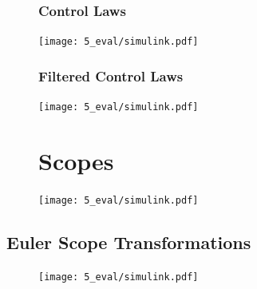 \documentclass[12pt]{ucthesis}
\begin{document}
	\begin{figure}
	\subsubsection{Control Laws}
	\label{subsubsec: app_FURY_eom5}
			\centering
			\texttt{[image: 5\_eval/simulink.pdf]}%
		\label{fig: cfbs_FURY_eom5}
	\end{figure}

	\begin{figure}
	\subsubsection{Filtered Control Laws}
	\label{subsubsec: app_FURY_eom6}
			\centering
			\texttt{[image: 5\_eval/simulink.pdf]}%
		\label{fig: cfbs_FURY_eom6}
	\end{figure}

	\begin{figure}
	\section{Scopes}
	\label{sec: app_SCOPES}
			\centering
			\texttt{[image: 5\_eval/simulink.pdf]}%
		\label{fig: cfbs_SCOPES1}
	\end{figure}
	
\subsection{Euler Scope Transformations}
\label{subsec: app_SCOPES2}
	\begin{figure}[H]
		\begin{adjustwidth}{-1in}{-1in}
			\centering
			\texttt{[image: 5\_eval/simulink.pdf]}%
		\end{adjustwidth}
		\label{fig: app_SCOPES2}
	\end{figure}


\cleardoublepage
{}
\end{document}
